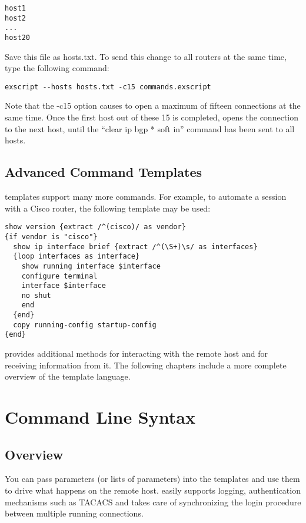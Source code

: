 \begin{lstlisting}
host1
host2
...
host20
\end{lstlisting}

Save this file as hosts.txt. To send this change to all routers at the same 
time, type the following command: 

\begin{lstlisting}
exscript --hosts hosts.txt -c15 commands.exscript
\end{lstlisting}

Note that the -c15 option causes \product to open a maximum of fifteen 
connections at the same time. Once the first host out of these 15 is 
completed, \product opens the connection to the next host, until the 
``clear ip bgp * soft in'' command has been sent to all hosts. 


\subsection{Advanced Command Templates}

\product templates support many more commands. For example, to automate a 
session with a Cisco router, the following template may be used: 

\begin{lstlisting}
show version {extract /^(cisco)/ as vendor}
{if vendor is "cisco"}
  show ip interface brief {extract /^(\S+)\s/ as interfaces}
  {loop interfaces as interface}
    show running interface $interface
    configure terminal
    interface $interface
    no shut
    end
  {end}
  copy running-config startup-config
{end}
\end{lstlisting}

\product provides additional methods for interacting with the remote 
host and for receiving information from it.
The following chapters include a more complete overview of the template 
language.


\section{Command Line Syntax}
\subsection{Overview}

You can pass parameters (or lists of parameters) into the templates and 
use them to drive what happens on the remote host. \product easily supports 
logging, authentication mechanisms such as TACACS and takes care of 
synchronizing the login procedure between multiple running connections.

